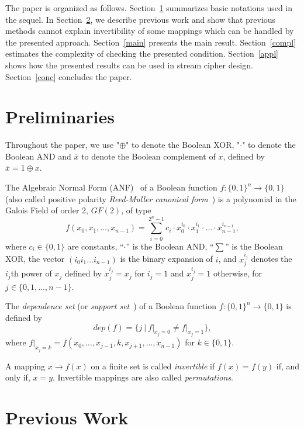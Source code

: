 \documentclass[9pt,conference]{IEEEtran} \usepackage{times}
\begin{document}
The paper is organized as follows. 
Section~\ref{not} summarizes basic notations used in the sequel.
In Section~\ref{prev}, we describe previous work and
show that previous methods cannot explain invertibility of some mappings which
can be handled by the presented approach.
Section~\ref{main} presents the main result. Section~\ref{compl}
estimates the complexity of checking the presented condition.
Section~\ref{appl} shows how the presented results can be used in
stream cipher design.
Section~\ref{conc} concludes the paper.


\section{Preliminaries} \label{not}

Throughout the paper, we use "$\oplus$" to 
denote the Boolean XOR, "$\cdot$"  
to denote the Boolean AND and $\overline{x}$ to denote the Boolean complement of $x$,
defined by $\overline{x} = 1 \oplus x$.  

The Algebraic Normal Form (ANF)~\cite{CuS09} of a Boolean function $f: \{0,1\}^{n} \rightarrow \{0,1\}$
(also called positive polarity {\em Reed-Muller canonical form}~\cite{Gr91}) is a polynomial in the Galois Field of order 2, $GF(2)$, of type
\[
f(x_0, x_1,\ldots,x_{n-1}) = \sum_{i=0}^{2^n-1}  c_i \cdot 
x_0^{i_0} \cdot x_1^{i_1} \cdot \ldots \cdot x_{n-1}^{i_{n-1}},
\]
where $c_{i} \in \{0,1\}$ are constants, ``$\cdot$'' is the Boolean AND, ``$\sum$'' is the Boolean XOR, the vector $(i_{0} i_{1} \ldots i_{n-1})$ is the binary expansion of $i$, and $x^{i_{j}}_{j}$ denotes the $i_{j}$th power of $x_{j}$ defined by
$x^{i_{j}}_{j} = x_{j}$ for $i_{j} = 1$ and $x^{i_{j}}_{j} = 1$ otherwise, for $j \in \{0,1, \ldots, n-1\}$.


The {\em dependence set} (or {\em support set}~\cite{espr}) of a Boolean function $f: \{0,1\}^n \rightarrow \{0,1\}$ 
is defined by
\[
dep(f) = \{j \ | \ f|_{x_j=0} \not = f|_{x_j=1}\},
\]
where $f|_{x_j=k} = f(x_0, \ldots, x_{j-1}, k, x_{j+1}, \ldots, x_{n-1})$
for $k \in \{0,1\}$.

A mapping $x \rightarrow f(x)$ on a finite set is called {\em invertible} if $f(x) = f(y)$ 
if, and only if, $x = y$. Invertible mappings are also called {\em permutations}.

\section{Previous Work} \label{prev}
\end{document}
